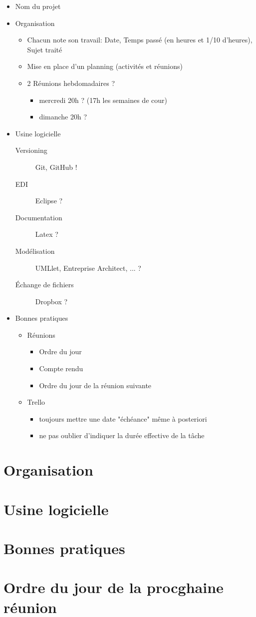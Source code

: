 \documentclass[11pt,a4paper,french,twoside,openright]{article}
\begin{document}
\begin{itemize}
\item Nom du projet
\item Organisation
  \begin{itemize}
  \item Chacun note son travail: Date, Temps passé (en heures et 1/10 d'heures), Sujet traité
  \item Mise en place d'un planning (activités et réunions)
  \item 2 Réunions hebdomadaires ?
    \begin{itemize}
    \item mercredi 20h ? (17h les semaines de cour)
    \item dimanche 20h ?
    \end{itemize}
  \end{itemize}
\item Usine logicielle
  \begin{description}
  \item[Versioning] Git, GitHub !
  \item[EDI] Eclipse ?
  \item[Documentation] Latex ?
  \item[Modélisation] UMLlet, Entreprise Architect, ... ?
  \item[Échange de fichiers] Dropbox ?
  \end{description}
\item Bonnes pratiques
  \begin{itemize}
  \item Réunions
    \begin{itemize}
    \item Ordre du jour
    \item Compte rendu
    \item Ordre du jour de la réunion suivante
    \end{itemize}
  \item Trello
    \begin{itemize}
    \item toujours mettre une date "échéance" même à posteriori
    \item ne pas oublier d'indiquer la durée effective de la tâche
    \end{itemize}
  \end{itemize}
\end{itemize}

\section{Organisation}

\section{Usine logicielle}

\section{Bonnes pratiques}

\section{Ordre du jour de la procghaine réunion}

\label{LastPage}
\end{document}
